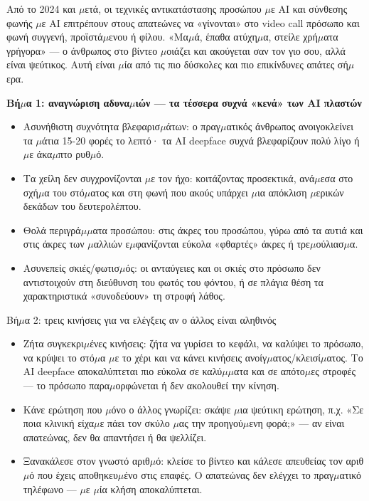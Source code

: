 
Από το 2024 και $\mu$ετά, οι τεχνικές αντικατάστασης προσώπου $\mu$ε AI και σύνθεσης φωνής $\mu$ε AI επιτρέπουν στους απατεώνες να «γίνονται» στο video call πρόσωπο και φωνή συγγενή, προϊστά$\mu$ενου ή φίλου. «Μα$\mu$ά, έπαθα ατύχη$\mu$α, στείλε χρή$\mu$ατα γρήγορα» — ο άνθρωπος στο βίντεο $\mu$οιάζει και ακούγεται σαν τον γιο σου, αλλά είναι ψεύτικος. Αυτή είναι $\mu$ία από τις πιο δύσκολες και πιο επικίνδυνες απάτες σή$\mu$ερα.

\textbf{Βή$\mu$α 1: αναγνώριση αδυνα$\mu$ιών — τα τέσσερα συχνά «κενά» των AI πλαστών}\par

\begin{itemize}
  \item Ασυνήθιστη συχνότητα βλεφαρισ$\mu$άτων: ο πραγ$\mu$ατικός άνθρωπος ανοιγοκλείνει τα $\mu$άτια 15-20 φορές το λεπτό· τα AI deepface συχνά βλεφαρίζουν πολύ λίγο ή $\mu$ε άκα$\mu$πτο ρυθ$\mu$ό.
  \item Τα χείλη δεν συγχρονίζονται $\mu$ε τον ήχο: κοιτάζοντας προσεκτικά, ανά$\mu$εσα στο σχή$\mu$α του στό$\mu$ατος και στη φωνή που ακούς υπάρχει $\mu$ια απόκλιση $\mu$ερικών δεκάδων του δευτερολέπτου.
  \item Θολά περιγρά$\mu$$\mu$ατα προσώπου: στις άκρες του προσώπου, γύρω από τα αυτιά και στις άκρες των $\mu$αλλιών ε$\mu$φανίζονται εύκολα «φθαρτές» άκρες ή τρε$\mu$ούλιασ$\mu$α.
  \item Ασυνεπείς σκιές/φωτισ$\mu$ός: οι ανταύγειες και οι σκιές στο πρόσωπο δεν αντιστοιχούν στη διεύθυνση του φωτός του φόντου, ή σε πλάγια θέση τα χαρακτηριστικά «συνοδεύουν» τη στροφή λάθος.
\end{itemize}

\begin{tcbinfo}{Βή$\mu$α 2: τρεις κινήσεις για να ελέγξεις αν ο άλλος είναι αληθινός}
\begin{itemize}
  \item Ζήτα συγκεκρι$\mu$ένες κινήσεις: ζήτα να γυρίσει το κεφάλι, να καλύψει το πρόσωπο, να κρύψει το στό$\mu$α $\mu$ε το χέρι και να κάνει κινήσεις ανοίγ$\mu$ατος/κλεισί$\mu$ατος. Το AI deepface αποκαλύπτεται πιο εύκολα σε καλύ$\mu$$\mu$ατα και σε απότο$\mu$ες στροφές — το πρόσωπο παρα$\mu$ορφώνεται ή δεν ακολουθεί την κίνηση.
  \item Κάνε ερώτηση που $\mu$όνο ο άλλος γνωρίζει: σκάψε $\mu$ια ψεύτικη ερώτηση, π.χ. «Σε ποια κλινική είχα$\mu$ε πάει τον σκύλο $\mu$ας την προηγού$\mu$ενη φορά;» — αν είναι απατεώνας, δεν θα απαντήσει ή θα ψελλίζει.
  \item Ξανακάλεσε στον γνωστό αριθ$\mu$ό: κλείσε το βίντεο και κάλεσε απευθείας τον αριθ$\mu$ό που έχεις αποθηκευ$\mu$ένο στις επαφές. Ο απατεώνας δεν ελέγχει το πραγ$\mu$ατικό τηλέφωνο — $\mu$ε $\mu$ία κλήση αποκαλύπτεται.
\end{itemize}

\end{tcbinfo}

